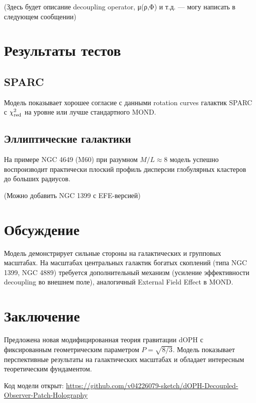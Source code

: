 \documentclass[12pt,a4paper]{article}
\begin{document}
(Здесь будет описание decoupling operator, μ(ρ,Φ) и т.д. — могу написать в следующем сообщении)

\section{Результаты тестов}

\subsection{SPARC}

Модель показывает хорошее согласие с данными rotation curves галактик SPARC с \(\chi^2_{\rm red}\) на уровне или лучше стандартного MOND.

\subsection{Эллиптические галактики}

На примере NGC 4649 (M60) при разумном \(M/L \approx 8\) модель успешно воспроизводит практически плоский профиль дисперсии глобулярных кластеров до больших радиусов.

(Можно добавить NGC 1399 с EFE-версией)

\section{Обсуждение}

Модель демонстрирует сильные стороны на галактических и групповых масштабах. На масштабах центральных галактик богатых скоплений (типа NGC 1399, NGC 4889) требуется дополнительный механизм (усиление эффективности decoupling во внешнем поле), аналогичный External Field Effect в MOND.

\section{Заключение}

Предложена новая модифицированная теория гравитации dOPH с фиксированным геометрическим параметром \(P = \sqrt{8/3}\). Модель показывает перспективные результаты на галактических масштабах и обладает интересным теоретическим фундаментом.

Код модели открыт: \url{https://github.com/v04226079-sketch/dOPH-Decoupled-Observer-Patch-Holography}
\end{document}
